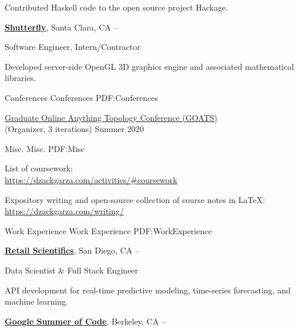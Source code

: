 \documentclass[letterpaper,MMMyyyy,nonstopmode]{simpleresumecv}
\begin{document}
\begin{Body}
\begin{Detail}
\SubBulletItem
Contributed Haskell code to the open source project Hackage.
\end{Detail}


\BigGap
\Entry
\href{http://www.shutterfly.com/}
{\textbf{Shutterfly}},
Santa Clara, CA
\hfill
{} --

\Gap
\BulletItem
Software Engineer, Intern/Contractor
\begin{Detail}
\SubBulletItem
Developed server-side OpenGL 3D graphics engine and associated mathematical libraries.
\end{Detail}



\Section
{Conferences}
{Conferences}
{PDF:Conferences}

\Gap
\BulletItem \href{https://dzackgarza.com/GOATS_2020/}{Graduate Online Anything Topology Conference (GOATS)} \\
(Organizer, 3 iterations)
\hfill Summer 2020


\Section
{Misc.}
{Misc.}
{PDF:Misc}

\BulletItem 
List of coursework: \\
\href{https://dzackgarza.com/activities/#coursework}{https://dzackgarza.com/activities/#coursework}

\BulletItem 
Expository writing and open-source collection of course notes in \LaTeX: \\
\href{https://dzackgarza.com/writing/}{https://dzackgarza.com/writing/}


\Section
{Work Experience}
{Work Experience}
{PDF:WorkExperience}

\Entry
\href{https://www.retailscientifics.com/}
{\textbf{Retail Scientifics}},
San Diego, CA
\hfill
{} --

\Gap
\BulletItem
Data Scientist \& Full Stack Engineer

\begin{Detail}
\SubBulletItem
API development for real-time predictive modeling, time-series forecasting, and machine learning.
\end{Detail}

\BigGap
\Entry
\href{https://summerofcode.withgoogle.com/archive/}
{\textbf{Google Summer of Code}},
Berkeley, CA
\hfill
{} --


\end{Body}
\end{document}
